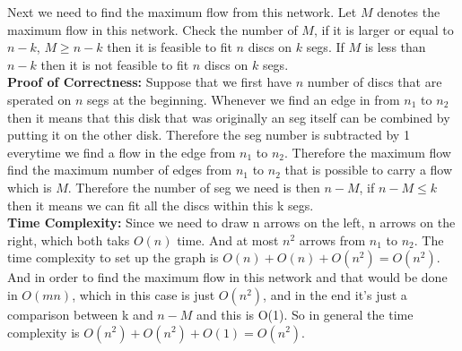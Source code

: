 \documentclass[14pt]{article}
\begin{document}
\begin{enumerate}
\begin{itemize}
\end{itemize}
Next we need to find the maximum flow from this network. Let $M$ denotes the 
maximum flow in this network. Check the number of $M$, if it is larger or equal
to $n-k$, $M \geq n-k$ then it is feasible to fit $n$ discs on $k$ segs. 
If $M$ is less than $n-k$ then it is not feasible to fit $n$ discs on $k$ segs.\\
\textbf{Proof of Correctness:} Suppose that we first have $n$ number of discs that
are sperated on $n$ segs at the beginning. Whenever we find an edge in from $n_1$
to $n_2$ then it means that this disk that was originally an seg itself can be 
combined by putting it on the other disk. Therefore the seg number is subtracted by
1 everytime we find a flow in the edge from $n_1$ to $n_2$. Therefore the maximum 
flow find the maximum number of edges from $n_1$ to $n_2$ that is possible to 
carry a flow which is $M$. Therefore the number of seg we need is then $n-M$, if 
$n-M \leq k$ then it means we can fit all the discs within this k segs. \\
\textbf{Time Complexity:} Since we need to draw n arrows on the left, n arrows on 
the right, which both taks $O(n)$ time. And at most $n^2$ arrows from $n_1$ to 
$n_2$. The time complexity to set up the graph is $O(n) +O(n)+ O(n^2) = O(n^2)$. And 
in order to find the maximum flow in this network and that would be done in $O(mn)$,
which in this case is just $O(n^2)$, and in the end it's just a comparison between
k and $n-M$ and this is O(1). So in general the time complexity is $ O(n^2)+O(n^2)+O(1)
= O(n^2)$.
\end{enumerate}
\end{document}
